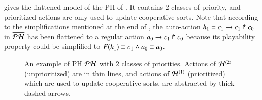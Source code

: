 \begin{example}
   gives the flattened model of the PH of .
  It contains $2$ classes of priority, and prioritized actions are only used to update cooperative sorts.
  Note that according to the simplifications mentioned at the end of ,
  the auto-action $h_1 = c_1\rightarrow c_1\Rsh c_0$ in $\overline{\mathcal{PH}}$ has been flattened to a regular action $a_0\rightarrow c_1\Rsh c_0$
  because its playability property could be simplified to $F(h_1) \equiv c_1 \wedge a_0 \equiv a_0$.
  
  \begin{figure}[htp]
    \centering
    \caption{
    \label{fig:metazoan-ph}
      An example of PH $\mathcal{PH}$ with $2$ classes of priorities.
      Actions of $\mathcal{H}^{(2)}$ (unprioritized) are in thin lines,
      and actions of $\mathcal{H}^{(1)}$ (prioritized) which are used to update cooperative sorts,
      are abstracted by thick dashed arrows.
    }
  \end{figure}
\end{example}

